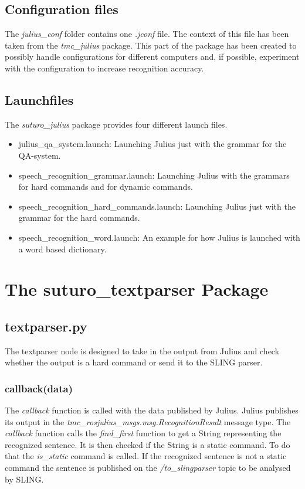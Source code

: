 \documentclass[main.tex]{subfiles}
\begin{document}
    \subsection{Configuration files}
        The \textit{julius\_conf} folder contains one \textit{.jconf} file. The context of this file has been taken from the \textit{tmc\_julius} package. This part of the package has been created to possibly handle configurations for different computers and, if possible, experiment with the configuration to increase recognition accuracy.
    \subsection{Launchfiles}
        The \textit{suturo\_julius} package provides four different launch files.\\
        \begin{itemize}
            \item julius\_qa\_system.launch:
            \subitem Launching Julius just with the grammar for the QA-system.
            \item speech\_recognition\_grammar.launch:
            \subitem Launching Julius with the grammars for hard commands and for dynamic commands.
            \item speech\_recognition\_hard\_commands.launch:
            \subitem Launching Julius just with the grammar for the hard commands.
            \item speech\_recognition\_word.launch:
            \subitem An example for how Julius is launched with a word based dictionary.
        \end{itemize}

\section{The suturo\_textparser Package}\label{textparser}
    \subsection{textparser.py}
        The textparser node is designed to take in the output from Julius and check whether the output is a hard command or send it to the SLING parser.
        \subsubsection{callback(data)}
            The \textit{callback} function is called with the data published by Julius. Julius publishes its output in the \textit{tmc\_rosjulius\_msgs.msg.RecognitionResult} message type. The \textit{callback} function calls the \textit{find\_first} function to get a String representing the recognized sentence. It is then checked if the String is a static command. To do that the \textit{is\_static} command is called. If the recognized sentence is not a static command the sentence is published on the \textit{/to\_slingparser} topic to be analysed by SLING.
    
\end{document}
